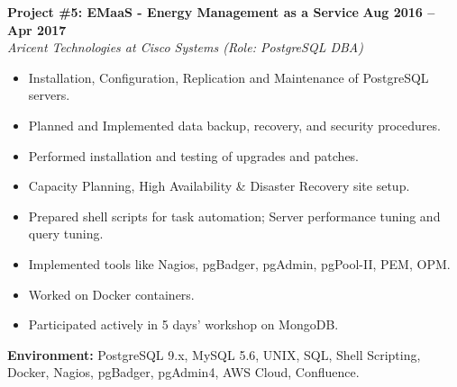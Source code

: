 \documentclass[10pt,a4paper]{article}
\begin{document}
\noindent
\begin{minipage}{\textwidth}
    \textbf{\large Project \#5: EMaaS - Energy Management as a Service} \hfill \textbf{Aug 2016 -- Apr 2017} \\
    \textit{Aricent Technologies at Cisco Systems (Role: PostgreSQL DBA)}
    \begin{itemize}[leftmargin=*, noitemsep, topsep=2pt]
        \item Installation, Configuration, Replication and Maintenance of PostgreSQL servers.
        \item Planned and Implemented data backup, recovery, and security procedures.
        \item Performed installation and testing of upgrades and patches.
        \item Capacity Planning, High Availability \& Disaster Recovery site setup.
        \item Prepared shell scripts for task automation; Server performance tuning and query tuning.
        \item Implemented tools like Nagios, pgBadger, pgAdmin, pgPool-II, PEM, OPM.
        \item Worked on Docker containers.
        \item Participated actively in 5 days' workshop on MongoDB.
    \end{itemize}
    \small{\textbf{Environment:} PostgreSQL 9.x, MySQL 5.6, UNIX, SQL, Shell Scripting, Docker, Nagios, pgBadger, pgAdmin4, AWS Cloud, Confluence.}
\end{minipage}
\vspace{10pt}
\end{document}
